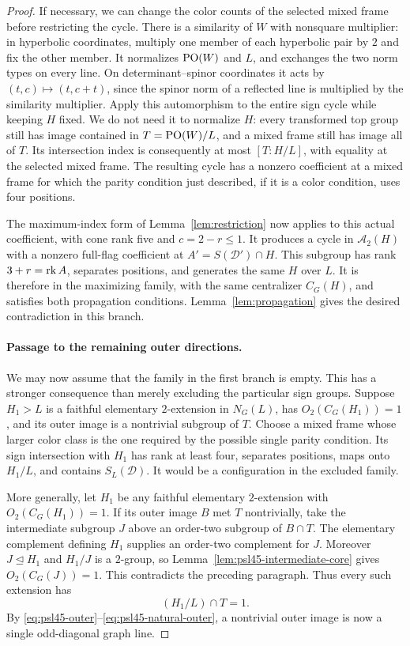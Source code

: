\begin{proof}
If necessary, we can change the color counts of the selected
mixed frame before restricting the cycle. There is a similarity
of $W$ with nonsquare multiplier: in hyperbolic coordinates,
multiply one member of each hyperbolic pair by $2$ and fix the
other member. It normalizes $\operatorname{PO}(W)$ and $L$, and exchanges the
two norm types on every line. On determinant--spinor coordinates it acts by
$(t,c)\mapsto(t,c+t)$, since the spinor norm of a reflected line is
multiplied by the similarity multiplier. Apply this automorphism to the
entire sign cycle while keeping $H$ fixed. We do not need it to
normalize $H$: every transformed top group still has image contained
in $T=\operatorname{PO}(W)/L$, and a mixed frame still has image all of $T$.
Its intersection index is consequently at most $[T:H/L]$, with
equality at the selected mixed frame. The resulting cycle
has a nonzero coefficient at a mixed frame for which the parity
condition just described, if it is a color condition, uses four
positions.

The maximum-index form of Lemma~\ref{lem:restriction} now applies
to this actual coefficient, with cone rank five and
$c=2-r\leq1$. It produces a cycle in $\mathcal A_2(H)$ with a
nonzero full-flag coefficient at
$A'=S(\mathcal D')\cap H$. This subgroup has rank $3+r=\operatorname{rk} A$,
separates positions, and generates the same $H$ over $L$.
It is therefore in the maximizing family, with the same
centralizer $C_G(H)$, and satisfies both propagation conditions.
Lemma~\ref{lem:propagation} gives the desired contradiction in
this branch.

\paragraph{Passage to the remaining outer directions.}
We may now assume that the family in the first branch is empty.
This has a stronger consequence than merely excluding the
particular sign groups. Suppose $H_1>L$ is a faithful elementary
$2$-extension in $N_G(L)$, has $O_2(C_G(H_1))=1$, and its outer
image is a nontrivial subgroup of $T$. Choose a mixed frame
whose larger color class is the one required by the possible
single parity condition. Its sign intersection with $H_1$ has
rank at least four, separates positions, maps onto $H_1/L$,
and contains $S_L(\mathcal D)$. It would be a configuration in
the excluded family.

More generally, let $H_1$ be any faithful elementary $2$-extension
with $O_2(C_G(H_1))=1$. If its outer image $B$ met $T$
nontrivially, take the intermediate subgroup $J$ above an
order-two subgroup of $B\cap T$. The elementary complement
defining $H_1$ supplies an order-two complement for $J$.
Moreover $J\trianglelefteq H_1$ and $H_1/J$ is a $2$-group,
so Lemma~\ref{lem:psl45-intermediate-core} gives
$O_2(C_G(J))=1$. This contradicts the preceding paragraph.
Thus every such extension has
\begin{equation}\label{eq:psl45-avoid}
 (H_1/L)\cap T=1.
\end{equation}
By \eqref{eq:psl45-outer}--\eqref{eq:psl45-natural-outer}, a
nontrivial outer image is now a single odd-diagonal graph line.


\end{proof}
